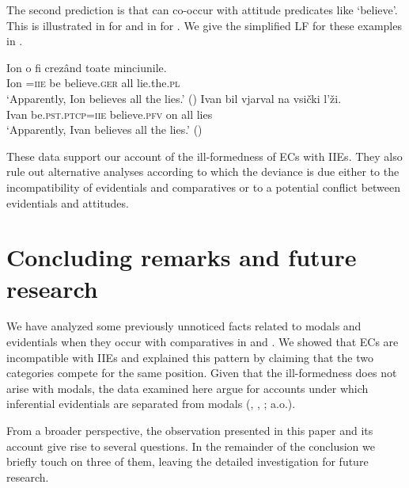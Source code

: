 \documentclass[output=paper,colorlinks,citecolor=brown,newtxmath]{langsci/langscibook}
\begin{document}
\noindent The second prediction is that  can co-occur with  attitude predicates like `believe'. This is illustrated in  for  and in  for . We give the simplified LF for these examples in .

    \ea \ea \gll Ion o fi crezând toate minciunile.\\
    Ion \textsc{=iie} be believe.\textsc{ger} all lie.the.\textsc{pl} \\
    \glt `Apparently, Ion believes all the lies.'  \hfill () \label{bela}
	\ex \gll Ivan bil vjarval na vsički l'ži.\\
   	 Ivan be.\textsc{pst.ptcp=iie} believe.\textsc{pfv} on all lies \\
    \glt `Apparently, Ivan believes all the lies.'   \hfill () \label{belb}
     \label{belc}
    \z \z

\noindent These data support our account of the ill-formedness of ECs with IIEs. They also rule out alternative analyses according to which the deviance is due either to the incompatibility of evidentials and comparatives or to a potential conflict between evidentials and  attitudes.

\section{Concluding remarks and future research}\label{ConcludRem}

We have analyzed some previously unnoticed facts related to  modals and evidentials when they occur with  comparatives in  and . We showed that ECs are incompatible with IIEs and explained this pattern by claiming that the two categories compete for the same position. Given that the ill-formedness does not arise with  modals, the  data examined here argue for accounts under which inferential evidentials are separated from  modals (\citealt{fall02}, \citealt{aikh14}, \citealt{murray10}; a.o.).

From a broader perspective, the observation presented in this paper and its account give rise to several  questions. In the remainder of the conclusion we briefly touch on three of them, leaving the detailed investigation for future research.
\end{document}
